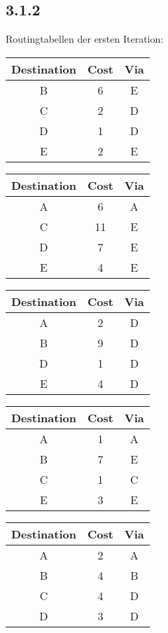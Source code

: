 \documentclass[a4paper,
			llpt,
			solution,
			accentcolor=tud2d,
			colorbacktitle
			]
			{tudexercise}
\newcommand{\8}{$\infty$}
\begin{document}
\subsection{3.1.2}
Routingtabellen der ersten Iteration:\\
\begin{multicols}{3}
\begin{tabular}{c|c|c}
Destination & Cost & Via \\ \hline
B           & 6    & E   \\
C           & 2    & D   \\
D           & 1    & D   \\
E           & 2    & E   \\
\end{tabular}
\begin{tabular}{c|c|c}
Destination & Cost & Via \\ \hline
A           & 6    & A   \\
C           & 11   & E   \\
D           & 7    & E   \\
E           & 4    & E   \\
\end{tabular}
\begin{tabular}{c|c|c}
Destination & Cost & Via \\ \hline
A           & 2    & D   \\
B           & 9    & D   \\
D           & 1    & D   \\
E           & 4    & D   \\
\end{tabular}
\begin{tabular}{c|c|c}
Destination & Cost & Via \\ \hline
A           & 1    & A   \\
B           & 7    & E   \\
C           & 1    & C   \\
E           & 3    & E   \\
\end{tabular}
\begin{tabular}{c|c|c}
Destination & Cost & Via \\ \hline
A           & 2    & A   \\
B           & 4    & B   \\
C           & 4    & D   \\
D           & 3    & D   \\
\end{tabular}
\end{multicols}
\end{document}
